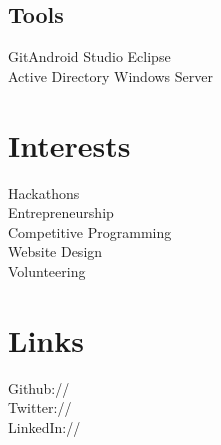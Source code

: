 \documentclass[]{DavidTsenterResume}
\begin{document}
\begin{minipage}[t]{0.33\textwidth}
\subsection{Tools}
\textbullet{} Git\textbullet{}Android Studio \textbullet{}Eclipse\\
\textbullet{}Active Directory \textbullet{}Windows Server  \\

\vspace{4mm}


\section{Interests}
\textbullet{} Hackathons \\
\textbullet{} Entrepreneurship \\
\textbullet{} Competitive Programming \\
\textbullet{} Website Design \\
\textbullet{} Volunteering\\
\sectionsep
\sectionsep

\section{Links} 
Github:// \href{https://github.com/tsenterd}{} \\
Twitter://  \href{https://twitter.com/TsenterDavid}{} \\
LinkedIn://  \href{https://www.linkedin.com/in/davidtsenter}{}
\sectionsep

%
%

\end{minipage} 
\hfill
\end{document}
